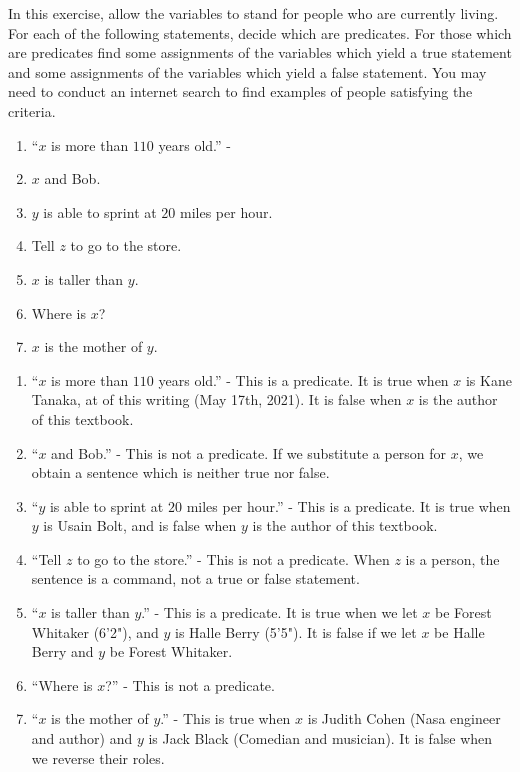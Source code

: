 \begin{xca} In this exercise, allow the variables to stand for people who are currently living.  For each of the following statements, decide which are predicates.  For those which are predicates find some assignments of the variables which yield a true statement and some assignments of the variables which yield a false statement.  You may need to conduct an internet search to find examples of people satisfying the criteria.
		\begin{enumerate}
	\item ``$x$ is more than $110$ years old.'' - 
	\item $x$ and Bob.
	\item $y$ is able to sprint at $20$ miles per hour.
	\item Tell $z$ to go to the store.
	\item $x$ is taller than $y$.
	\item Where is $x$?
	\item $x$ is the mother of $y$.
\end{enumerate}

\end{xca}

\begin{solutions}


	\begin{enumerate}
	\item ``$x$ is more than $110$ years old.'' - This is a predicate.  It is true when $x$ is Kane Tanaka, at of this writing (May 17th, 2021).  It is false when $x$ is the author of this textbook.
	\item ``$x$ and Bob.'' - This is not a predicate.  If we substitute a person for $x$, we obtain a sentence which is neither true nor false.
	\item ``$y$ is able to sprint at $20$ miles per hour.'' - This is a predicate.  It is true when $y$ is Usain Bolt, and is false when $y$ is the author of this textbook.
	\item ``Tell $z$ to go to the store.'' - This is not a predicate.  When $z$ is a person, the sentence is a command, not a true or false statement. 
	\item ``$x$ is taller than $y$.'' - This is a predicate.  It is true when we let $x$ be Forest Whitaker (6'2"), and $y$ is Halle Berry (5'5").  It is false if we let $x$ be Halle Berry and $y$ be Forest Whitaker.
	\item ``Where is $x$?'' - This is not a predicate.
	\item ``$x$ is the mother of $y$.'' - This is true when $x$ is Judith Cohen (Nasa engineer and author) and $y$ is Jack Black (Comedian and musician).  It is false when we reverse their roles.
\end{enumerate}
		
	\end{solutions}

